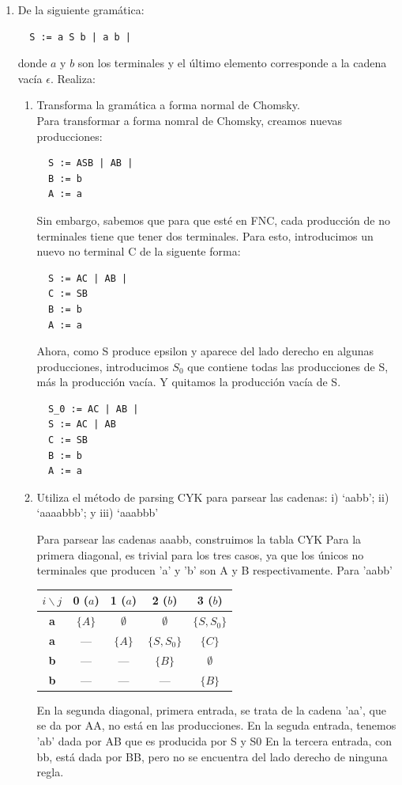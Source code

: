 \documentclass[12pt, letterpaper]{article}
\begin{document}
\begin{enumerate}
\item De la siguiente gramática:
\begin{verbatim}
  S := a S b | a b | 
\end{verbatim}
donde $a$ y $b$ son los terminales y el último elemento corresponde a la cadena vacía $\epsilon$. Realiza:
\begin{enumerate}[label=(\alph*)]
\item Transforma la gramática a forma normal de Chomsky.\\
  Para transformar a forma nomral de Chomsky, creamos nuevas producciones:
\begin{verbatim}
  S := ASB | AB |
  B := b
  A := a
\end{verbatim}
Sin embargo, sabemos que para que esté en FNC, cada producción de no terminales tiene que tener dos terminales. Para esto, introducimos un nuevo no terminal C de la siguente forma:
\begin{verbatim}
  S := AC | AB |
  C := SB
  B := b
  A := a
\end{verbatim}
Ahora, como S produce epsilon y aparece del lado derecho en algunas producciones, introducimos $S_0$ que contiene todas las producciones de S, más la producción vacía. Y quitamos la producción vacía de S.
\begin{verbatim}
  S_0 := AC | AB |
  S := AC | AB
  C := SB
  B := b
  A := a
\end{verbatim}
\item Utiliza el método de parsing CYK para parsear las cadenas: i) `aabb'; ii) `aaaabbb'; y iii) `aaabbb'

  Para parsear las cadenas aaabb, construimos la tabla CYK
  Para la primera diagonal, es trivial para los tres casos, ya que los únicos no terminales que producen 'a' y 'b' son A y B respectivamente.
  \newpage
  Para 'aabb'
  \begin{table}[h!]
    \centering
    \begin{tabular}{ccccc}
      \toprule
      $i \backslash j$ & \textbf{0 ($a$)} & \textbf{1 ($a$)} & \textbf{2 ($b$)} & \textbf{3 ($b$)} \\
      \midrule
      \textbf{a} & $\{A\}$ & $\emptyset$ & $\emptyset$ & $\{S, S_0\}$ \\
      \textbf{a} & — & $\{A\}$ & $\{S, S_0\}$ & $\{C\}$ \\
      \textbf{b} & — & — & $\{B\}$ & $\emptyset$ \\
      \textbf{b} & — & — & — & $\{B\}$ \\
      \bottomrule
    \end{tabular}
  \end{table}
  En la segunda diagonal, primera entrada, se trata de la cadena 'aa', que se da por AA, no está en las producciones.
  En la seguda entrada, tenemos 'ab' dada por AB que es producida por S y S0
  En la tercera entrada, con bb, está dada por BB, pero no se encuentra del lado derecho de ninguna regla.\\


\end{enumerate}
\end{enumerate}
\end{document}
